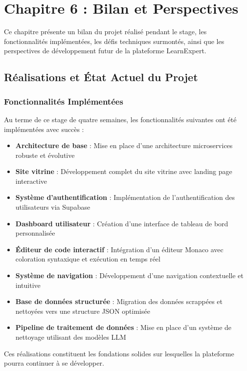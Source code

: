\chapter*{Chapitre 6 : Bilan et Perspectives}
\thispagestyle{fancy}
\setcounter{section}{0}
\newpage

Ce chapitre présente un bilan du projet réalisé pendant le stage, les fonctionnalités implémentées, les défis techniques surmontés, ainsi que les perspectives de développement futur de la plateforme LearnExpert.

\section{Réalisations et État Actuel du Projet}

\subsection{Fonctionnalités Implémentées}
Au terme de ce stage de quatre semaines, les fonctionnalités suivantes ont été implémentées avec succès :

\begin{itemize}
  \item \textbf{Architecture de base} : Mise en place d'une architecture microservices robuste et évolutive
  \item \textbf{Site vitrine} : Développement complet du site vitrine avec landing page interactive
  \item \textbf{Système d'authentification} : Implémentation de l'authentification des utilisateurs via Supabase
  \item \textbf{Dashboard utilisateur} : Création d'une interface de tableau de bord personnalisée
  \item \textbf{Éditeur de code interactif} : Intégration d'un éditeur Monaco avec coloration syntaxique et exécution en temps réel
  \item \textbf{Système de navigation} : Développement d'une navigation contextuelle et intuitive
  \item \textbf{Base de données structurée} : Migration des données scrappées et nettoyées vers une structure JSON optimisée
  \item \textbf{Pipeline de traitement de données} : Mise en place d'un système de nettoyage utilisant des modèles LLM
\end{itemize}

Ces réalisations constituent les fondations solides sur lesquelles la plateforme pourra continuer à se développer.

